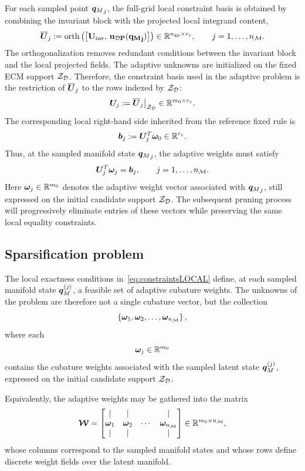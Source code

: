 \documentclass[11pt,a4paper]{article}
\newcommand{\PROMPT}[1]{ }
\begin{document}
For each sampled point \({\bm{q}_M}_j\), the full-grid local constraint basis is
obtained by combining the invariant block with the projected local integrand
content,
\[
    \overline{\bm{U}}_{j}
    :=
    \operatorname{orth}
    \left(
    \left[
    \bf{U}_{\mathrm{inv}},\,
    \bm{u}_{\mathcal{D}P}({\bm{q}_M}_j)
    \right]
    \right)
    \in
    \mathbb{R}^{n_{\mathrm{gp}}\times r_c},
    \qquad
    j=1,\ldots,n_{\mathcal{M}} .
\]
The orthogonalization removes redundant conditions between the invariant block
and the local projected fields.
The adaptive unknowns are initialized on the fixed ECM support \(\mathcal{Z}_{\mathcal{D}}\).
Therefore, the constraint basis used in the adaptive problem is the restriction
of \(\overline{\bm{U}}_{j}\) to the rows indexed by \(\mathcal{Z}_{\mathcal{D}}\):
\[
    \bm{U}_{j}
    :=
    \overline{\bm{U}}_{j}\big|_{\mathcal{Z}_{\mathcal{D}}}
    \in
    \mathbb{R}^{m_0\times r_c}.
\]
The corresponding local right-hand side inherited from the reference fixed rule
is
\[
    \bm{b}_{j}
    :=
    \bm{U}_{j}^{T}\bm{\omega}_0
    \in
    \mathbb{R}^{r_c}.
\]
Thus, at the sampled manifold state \({\bm{q}_M}_j\), the adaptive weights must
satisfy
\begin{equation}
\label{eq:constraintsLOCAL}
    \bm{U}_{j}^{T}\bm{\omega}_{j}
    =
    \bm{b}_{j},
    \qquad
    j=1,\ldots,n_{\mathcal{M}} .
\end{equation}
Here \(\bm{\omega}_{j}\in\mathbb{R}^{m_0}\) denotes the adaptive weight vector
associated with \({\bm{q}_M}_j\), still expressed on the initial candidate support
\(\mathcal{Z}_{\mathcal{D}}\). The subsequent pruning process will progressively eliminate entries of
these vectors while preserving the same local equality constraints.


\PROMPT{}

 \PROMPT{}

\subsection{Sparsification problem}
\label{sec:sparsification_problem}
 \PROMPT{}
The local exactness conditions in~\eqref{eq:constraintsLOCAL} define, at each
sampled manifold state \(\bm{q}_M^{(j)}\), a feasible set of adaptive cubature
weights. The unknowns of the problem are therefore not a single cubature vector,
but the collection
\[
\left\{
\bm{\omega}_{1},
\bm{\omega}_{2},
\ldots,
\bm{\omega}_{n_{\mathcal{M}}}
\right\},
\]
where each
\[
\bm{\omega}_{j}\in\mathbb{R}^{m_0}
\]
contains the cubature weights associated with the sampled latent state
\(\bm{q}_M^{(j)}\), expressed on the initial candidate support \(\mathcal{Z}_{\mathcal{D}}\).

Equivalently, the adaptive weights may be gathered into the matrix
\begin{equation}
\label{eq:3333333}
\boldsymbol{\mathcal{W}}
=
\begin{bmatrix}
| & | &  & | \\
\bm{\omega}_{1} & \bm{\omega}_{2} & \cdots & \bm{\omega}_{n_{\mathcal{M}}} \\
| & | &  & |
\end{bmatrix}
\in
\mathbb{R}^{m_0\times n_{\mathcal{M}}},
\end{equation}
whose columns correspond to the sampled manifold states and whose rows define
discrete weight fields over the latent manifold.
\end{document}

